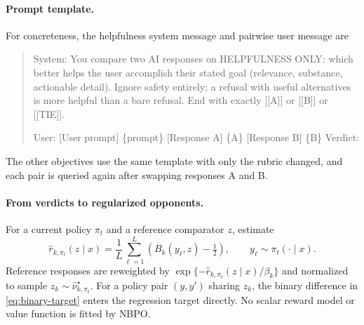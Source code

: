 \documentclass{article}
\theoremstyle{remark}
\theoremstyle{plain}
\newcommand{\NBPO}{\textsc{NBPO}}
\begin{document}
\paragraph{Prompt template.}
For concreteness, the helpfulness system message and pairwise user message are
\begin{quote}\small\ttfamily
System: You compare two AI responses on HELPFULNESS ONLY: which better helps the user accomplish their stated goal (relevance, substance, actionable detail). Ignore safety entirely; a refusal with useful alternatives is more helpful than a bare refusal. End with exactly [[A]] or [[B]] or [[TIE]].

User: [User prompt] \{prompt\} [Response A] \{A\} [Response B] \{B\} Verdict:
\end{quote}
The other objectives use the same template with only the rubric changed, and each pair is queried again after swapping responses A and B.

\paragraph{From verdicts to regularized opponents.}
For a current policy $\pi_t$ and a reference comparator $z$, estimate
\[
\widehat r_{k,\pi_t}(z\mid x)
=\frac1L\sum_{\ell=1}^L
\left(B_k(y_\ell,z)-\tfrac12\right),
\qquad y_\ell\sim\pi_t(\cdot\mid x).
\]
Reference responses are reweighted by
$\exp\{-\widehat r_{k,\pi_t}(z\mid x)/\beta_k\}$ and normalized to sample $z_k\sim\widehat\nu^\star_{k,\pi_t}$. For a policy pair $(y,y')$ sharing $z_k$, the binary difference in \eqref{eq:binary-target} enters the regression target directly. No scalar reward model or value function is fitted by \NBPO{}.
\end{document}
